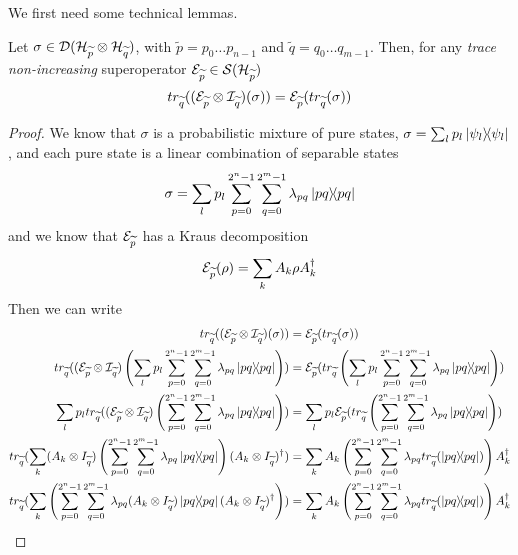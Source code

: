 We first need some technical lemmas. 
\newcommand{\discQ}{disc(\widetilde{q})}
\newcommand{\trQ}{tr_{\widetilde{q}}}

\begin{lemma}\label{trace_and_sop}
Let $\sigma \in  \mathcal{D}(\mathcal{H}_{\widetilde{p}} \otimes \mathcal{H}_{\widetilde{q}})$, with $\widetilde{p} = p_0 \ldots p_{n-1}$ and $\widetilde{q} = q_0 \ldots q_{m-1}$. Then, for any \textit{trace non-increasing} superoperator $\mathcal{E}_{\widetilde{p}} \in \mathcal{S}(\mathcal{H}_{\widetilde{p}})$
\[ \trQ((\sop_{\widetilde{p}} \otimes \mathcal{I}_{\widetilde{q}})(\sigma)) = \sop_{\widetilde{p}}(\trQ(\sigma))
\]
\end{lemma}
\begin{proof}
We know that $\sigma$ is a probabilistic mixture of pure states, $\sigma = \sum_l p_l \ket{\psi_l}\!\!\bra{\psi_l}$, and each pure state is a linear combination of separable states 
\[\sigma = \sum_l p_l \sum_{p = 0}^{2^n-1} \sum_{q = 0}^{2^m-1} \lambda_{pq} \ket{pq}\!\!\bra{pq}\]
and we know that $\mathcal{E}_{\widetilde{p}}$ has a Kraus decomposition 
\[\mathcal{E}_{\widetilde{p}}(\rho) = \sum_k A_k \rho A_k^\dagger\]
Then we can write 
\hspace*{-2cm}\begin{align*}
\trQ((\sop_{\widetilde{p}} \otimes \mathcal{I}_{\widetilde{q}})(\sigma)) &= \sop_{\widetilde{p}}(\trQ(\sigma)) 
\\ 
\trQ((\sop_{\widetilde{p}} \otimes \mathcal{I}_{\widetilde{q}})\left(\sum_l p_l \sum_{p = 0}^{2^n-1} \sum_{q = 0}^{2^m-1} \lambda_{pq} \proj{pq}\right)) &= \sop_{\widetilde{p}}(\trQ\left(\sum_l p_l \sum_{p = 0}^{2^n-1} \sum_{q = 0}^{2^m-1} \lambda_{pq} \proj{pq}\right))
\\
\sum_l p_l \trQ((\sop_{\widetilde{p}} \otimes \mathcal{I}_{\widetilde{q}})\left( \sum_{p = 0}^{2^n-1} \sum_{q = 0}^{2^m-1} \lambda_{pq} \proj{pq}\right)) 
&= \sum_l p_l \sop_{\widetilde{p}}(\trQ\left( \sum_{p = 0}^{2^n-1} \sum_{q = 0}^{2^m-1} \lambda_{pq} \proj{pq}\right))
\\
\trQ(\sum_k (A_k \otimes I_{\widetilde{q}})\left( \sum_{p = 0}^{2^n-1} \sum_{q = 0}^{2^m-1} \lambda_{pq} \proj{pq}\right)(A_k \otimes I_{\widetilde{q}})^\dagger )
&= \sum_k A_k\left( \sum_{p = 0}^{2^n-1} \sum_{q = 0}^{2^m-1} \lambda_{pq} \trQ(\proj{pq})\right) A_k^\dagger 
\\
\trQ(\sum_k  \left( \sum_{p = 0}^{2^n-1} \sum_{q = 0}^{2^m-1} \lambda_{pq} (A_k \otimes I_{\widetilde{q}}) \proj{pq} (A_k \otimes I_{\widetilde{q}})^\dagger  \right) )
&= \sum_k A_k\left( \sum_{p = 0}^{2^n-1} \sum_{q = 0}^{2^m-1} \lambda_{pq} \trQ(\proj{pq})\right) A_k^\dagger

\end{align*}
\end{proof}
